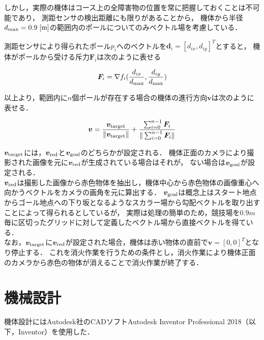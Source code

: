 \documentclass[11pt,a4]{jsarticle}
\begin{document}
  しかし，実際の機体はコース上の全障害物の位置を常に把握しておくことは不可能であり，
  測距センサの検出距離にも限りがあることから，
  機体から半径$d_{\rm{max}} = 0.9 \hspace{1mm}\mathrm{[m]}$の範囲内のポールについてのみベクトル場を考慮している．

  測距センサにより得られたポール$p_i$へのベクトルを$\bm{d}_i = [d_{ix}, d_{iy}]^{T}$とすると，
  機体がポールから受ける斥力$\bm{F}_i$は次のように表せる

  \begin{equation}
    \bm{F}_i = \nabla f_i(\frac{d_{ix}}{d_{\rm{max}}}, \frac{d_{iy}}{d_{\rm{max}}})
  \end{equation}

  以上より，範囲内に$n$個ポールが存在する場合の機体の進行方向$\bm{v}$は次のように表せる．

  \begin{equation}
    \bm{v} = \frac{\bm{v}_{\rm{target}}}{\|\bm{v}_{\rm{target}}\|} + \frac{\sum_{i=0}^{n-1}{\bm{F}_i}}{\|\sum_{i=0}^{n-1}{\bm{F}_i}\|}
  \end{equation}

  $\bm{v}_{\rm{target}}$には，$\bm{v}_{\rm{red}}$と$\bm{v}_{\rm{goal}}$のどちらかが設定される．
  機体正面のカメラにより撮影された画像を元に$\bm{v}_{\rm{red}}$が生成されている場合はそれが，
  ない場合は$\bm{v}_{\rm{goal}}$が設定される．\\

  $\bm{v}_{\rm{red}}$は撮影した画像から赤色物体を抽出し，機体中心から赤色物体の画像重心へ向かうベクトルをカメラの画角を元に算出する．
  $\bm{v}_{\rm{goal}}$は概念上はスタート地点からゴール地点への下り坂となるようなスカラー場から勾配ベクトルを取り出すことによって得られるとしているが，
  実際は処理の簡単のため，競技場を$0.9\unit{m}$毎に区切ったグリッドに対して定義したベクトル場から直接ベクトルを得ている．\\

  なお，$\bm{v}_{\rm{target}}$に$\bm{v}_{\rm{red}}$が設定された場合，機体は赤い物体の直前で$\bm{v} = [0, 0]^{T}$となり停止する．
  これを消火作業を行うための条件とし，消火作業により機体正面のカメラから赤色の物体が消えることで消火作業が終了する．

\section{機械設計}  %

  機体設計にはAutodesk社のCADソフトAutodesk Inventor Professional 2018（以下，Inventor）を使用した．
\end{document}
